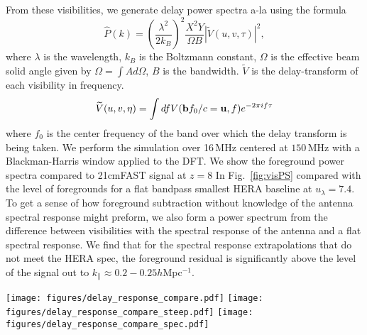 \documentclass[useAMS,usenatbib]{mn2e}
\begin{document}
From these visibilities, we generate delay power spectra a-la \citep{Parsons:2014} using the formula
\begin{equation}
\widehat{P}(k) = \left( \frac{\lambda^2}{2 k_B} \right)^2 \frac{X^2 Y}{\Omega B} \left| \widetilde{V}(u,v,\tau) \right|^2,
\end{equation}
where $\lambda$ is the wavelength, $k_B$ is the Boltzmann constant, $\Omega$ is the effective beam solid angle given by $\Omega = \int A d\Omega$, $B$ is the bandwidth. $\widetilde{V}$ is the delay-transform of each visibility in frequency. 
\begin{equation}
\widetilde{V}(u,v,\eta) = \int d f V( {\bf b}f_0/c = {\bf u},f)e^{-2 \pi i f \tau}
\end{equation}
where $f_0$ is the center frequency of the band over which the delay transform is being taken. We perform the simulation over 16\,MHz centered at $150$\,MHz with a Blackman-Harris window applied to the DFT.  We show the foreground power spectra compared to 21cmFAST signal at $z=8$ In Fig.~\ref{fig:visPS} compared with the level of foregrounds for a flat bandpass smallest HERA baseline at $u_\lambda = 7.4$. To get a sense of how foreground subtraction without knowledge of the antenna spectral response might preform, we also form a power spectrum from the difference between visibilities with the spectral response of the antenna and a flat spectral response. We find that for the spectral response extrapolations that do not meet the HERA spec, the foreground residual is significantly above the level of the signal out to $k_\parallel \approx 0.2-0.25h$Mpc$^{-1}$. 


\begin{figure*}
\texttt{[image: figures/delay\_response\_compare.pdf]}
\texttt{[image: figures/delay\_response\_compare\_steep.pdf]}
\texttt{[image: figures/delay\_response\_compare\_spec.pdf]}
\caption{The foreground power spectrum for the smallest HERA baseline with a flat bandpass (solid blue line) and the antenna response function (solid green line). The horizon + a 0.1 $h$Mpc$^{-1}$ buffer is denoted by the vertical black line. The residual visibility obtained from subtracting the foreground visibiliteis with a flat response function (as we might expect from model subraction) (red dashed line) is shown for our extrapolated response function (left), the steep response function (middle) and the response function forced to meet spec (right). For the response functions that do not meet the HERA spec, residuals after foreground subtraction remain above the signal level out to $k_\| \approx 0.2-0.25 h$Mpc$^{-1}$. In the response function that does meet the spec, residuals pass below the signal at $k_\| \approx 0.2 h$Mpc$^{-1}$.  }
\label{fig:visPS}
\end{figure*}
\end{document}
